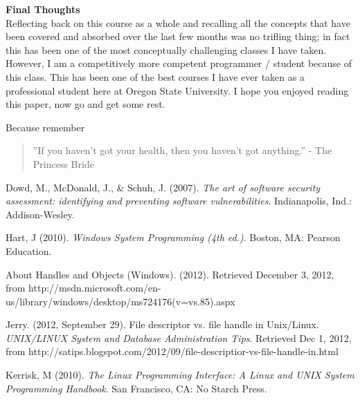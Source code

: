 \documentclass[11pt]{report}
\begin{document}
\textbf{\large Final Thoughts}\\
Reflecting back on this course as a whole and recalling all the concepts that have been covered and absorbed over the last few months was no trifling thing; in fact this has been one of the most conceptually challenging classes I have taken. However, I am a competitively more competent programmer / student because of this class. This has been one of the best courses I have ever taken as a professional student here at Oregon State University. I hope you enjoyed reading this paper, now go and get some rest.

Because remember 
\begin{quote}''If you haven't got your health, then you haven't got anything.'' - The Princess Bride \end{quote}

\begin{thebibliography}{9}

  Dowd, M., McDonald, J., \& Schuh, J. (2007).
  \emph{The art of software security assessment: identifying and preventing software vulnerabilities}.
   Indianapolis, Ind.: Addison-Wesley.

  Hart, J (2010).
  \emph{Windows System Programming (4th ed.)}.
  Boston, MA: Pearson Education.

  About Handles and Objects (Windows). (2012). Retrieved December 3, 2012, from http://msdn.microsoft.com/en-us/library/windows/desktop/ms724176(v=vs.85).aspx

  Jerry. (2012, September 29). File descriptor vs. file handle in Unix/Linux.
  \emph{UNIX/LINUX System and Database Administration Tips}.
  Retrieved Dec 1, 2012, from http://satips.blogspot.com/2012/09/file-descriptior-vs-file-handle-in.html

  Kerrisk, M (2010).
  \emph{The Linux Programming Interface: A Linux and UNIX System Programming Handbook}.
  San Francisco, CA: No Starch Press.

\end{thebibliography}
\end{document}
